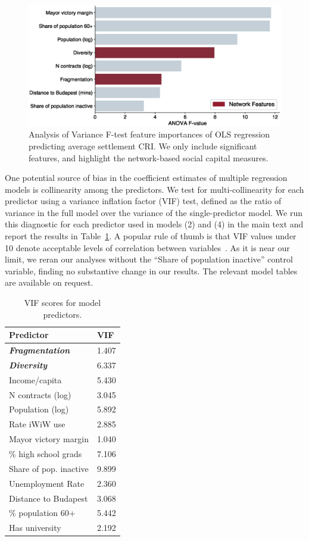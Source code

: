 \begin{figure}
\includegraphics[width=\textwidth]{images/iwiw/feature_importances.eps}
\caption{Analysis of Variance F-test feature importances of OLS regression predicting average settlement CRI. We only include significant features, and highlight the network-based social capital measures.}
\label{fig:feat_imps}
\end{figure}

One potential source of bias in the coefficient estimates of multiple regression models is collinearity among the predictors. We test for multi-collinearity for each predictor using a variance inflation factor (VIF) test, defined as the ratio of variance in the full model over the variance of the single-predictor model. We run this diagnostic for each predictor used in models (2) and (4) in the main text and report the results in Table~\ref{tab:vif}. A popular rule of thumb is that VIF values under 10 denote acceptable levels of correlation between variables~\cite{hair1999analysis}. As it is near our limit, we reran our analyses without the ``Share of population inactive'' control variable, finding no substantive change in our results. The relevant model tables are available on request.

\begin{table}
\begin{center}
\begin{tabular}{ l  l   }\toprule
Predictor & VIF   \\\midrule
\textbf{\textit{Fragmentation}} &1.407\\ 
\textbf{\textit{Diversity}} & 6.337 \\
Income/capita & 5.430 \\ 
N contracts (log)& 3.045  \\
Population (log) & 5.892 \\ 
Rate iWiW use& 2.885 \\
Mayor victory margin & 1.040 \\ 
\% high school grads & 7.106  \\
Share of pop. inactive & 9.899 \\ 
Unemployment Rate & 2.360  \\
Distance to Budapest & 3.068 \\ 
\% population 60+ & 5.442  \\
Has university & 2.192  \\
\bottomrule
\end{tabular}
\caption{VIF scores for model predictors.}
\label{tab:vif}
\end{center}
\end{table}

